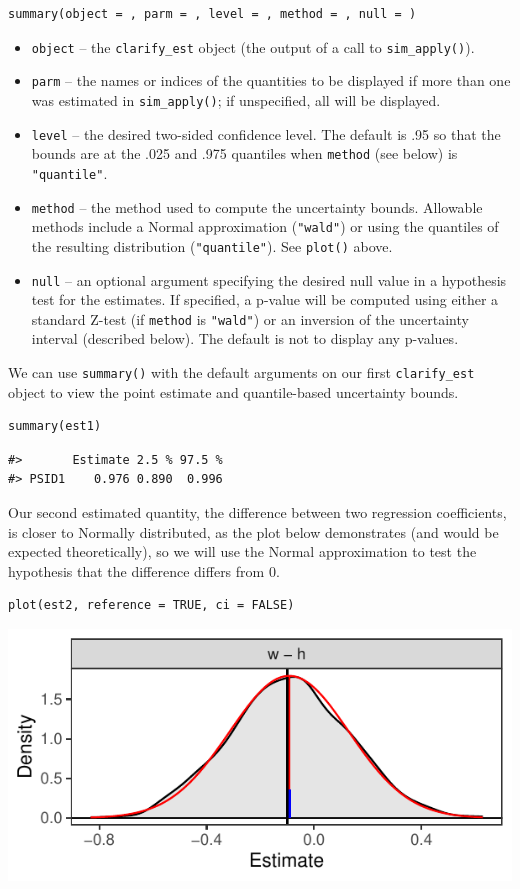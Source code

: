 \begin{verbatim}
summary(object = , parm = , level = , method = , null = )
\end{verbatim}
\begin{itemize}
\tightlist
\item
  \texttt{object} -- the \texttt{clarify\_est} object (the output of a call to \texttt{sim\_apply()}).
\item
  \texttt{parm} -- the names or indices of the quantities to be displayed if more than one was estimated in \texttt{sim\_apply()}; if unspecified, all will be displayed.
\item
  \texttt{level} -- the desired two-sided confidence level. The default is .95 so that the bounds are at the .025 and .975 quantiles when \texttt{method} (see below) is \texttt{"quantile"}.
\item
  \texttt{method} -- the method used to compute the uncertainty bounds. Allowable methods include a Normal approximation (\texttt{"wald"}) or using the quantiles of the resulting distribution (\texttt{"quantile"}). See \texttt{plot()} above.
\item
  \texttt{null} -- an optional argument specifying the desired null value in a hypothesis test for the estimates. If specified, a p-value will be computed using either a standard Z-test (if \texttt{method} is \texttt{"wald"}) or an inversion of the uncertainty interval (described below). The default is not to display any p-values.
\end{itemize}
We can use \texttt{summary()} with the default arguments on our first \texttt{clarify\_est} object to view the point estimate and quantile-based uncertainty bounds.
\begin{verbatim}
summary(est1)
\end{verbatim}
\begin{verbatim}
#>       Estimate 2.5 % 97.5 %
#> PSID1    0.976 0.890  0.996
\end{verbatim}
Our second estimated quantity, the difference between two regression coefficients, is closer to Normally distributed, as the plot below demonstrates (and would be expected theoretically), so we will use the Normal approximation to test the hypothesis that the difference differs from 0.
\begin{verbatim}
plot(est2, reference = TRUE, ci = FALSE)
\end{verbatim}
\begin{center}\includegraphics{figures/plot2-1} \end{center}
